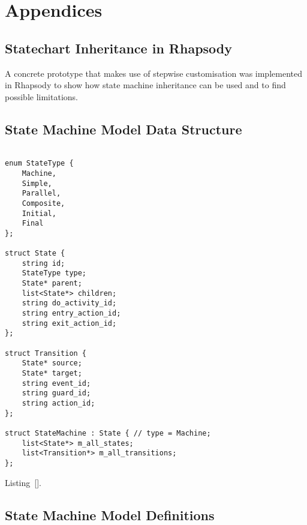 \appendix

\section*{Appendices}
\renewcommand{\thesubsection}{\Alph{subsection}}

\label{annex:framework}

\subsection{Statechart Inheritance in Rhapsody\label{annex:proto_inheritance}}

A concrete prototype that makes use of stepwise customisation was implemented in Rhapsody to
show how state machine inheritance can be used and to find possible limitations.




\clearpage
\subsection{State Machine Model Data Structure\label{annex:proto_delta}}

\begin{lstlisting}[language=CXX, label={lst:proto_sm_model}, caption={State machine model data structure.}]

enum StateType {
    Machine,
    Simple,
    Parallel,
    Composite,
    Initial,
    Final
};

struct State {
    string id;
    StateType type;
    State* parent;
    list<State*> children;
    string do_activity_id;
    string entry_action_id;
    string exit_action_id;
};

struct Transition {
    State* source;
    State* target;
    string event_id;
    string guard_id;
    string action_id;
};

struct StateMachine : State { // type = Machine;
    list<State*> m_all_states;
    list<Transition*> m_all_transitions;
};

\end{lstlisting}

Listing~[].


\clearpage
\subsection{State Machine Model Definitions\label{annex:impl_basic_sm}}

